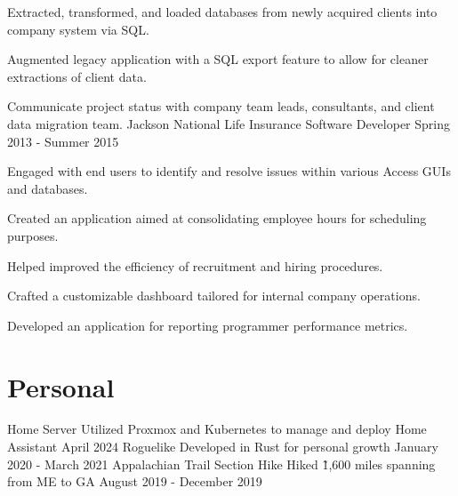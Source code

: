 \documentclass{marvinkassabian_resume}
\begin{document}
					\resumesublistbegin
						\item Extracted, transformed, and loaded databases from newly acquired clients into company system via SQL.
						\item Augmented legacy \cpp application with a SQL export feature to allow for cleaner extractions of client data.
						\item Communicate project status with company team leads, consultants, and client data migration team.
					\resumesublistend
			\resumesublistend
		\subsectionpositiondate
				{Jackson National Life Insurance}
				{Software Developer}
				{Spring 2013 - Summer 2015}
					\resumesublistbegin
						\item Engaged with end users to identify and resolve issues within various Access GUIs and databases.
						\item Created an application aimed at consolidating employee hours for scheduling purposes.
						\item Helped improved the efficiency of recruitment and hiring procedures.
						\item Crafted a customizable dashboard tailored for internal company operations.
						\item Developed an application for reporting programmer performance metrics.
					\resumesublistend
	\section{Personal}
		\subsectionlocationdate
				{Home Server}
				{Utilized Proxmox and Kubernetes to manage and deploy Home Assistant}
				{April 2024}
		\subsectionlocationdate
				{Roguelike}
				{Developed in Rust for personal growth}
				{January 2020 - March 2021}
		\subsectionlocationdate
				{Appalachian Trail Section Hike}
				{Hiked \~1,600 miles spanning from ME to GA}
				{August 2019 - December 2019}
\end{document}
